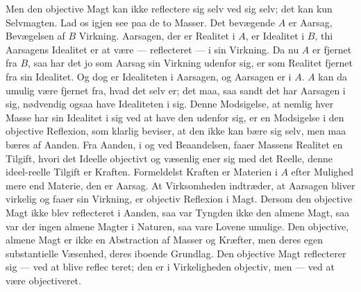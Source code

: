 \documentclass[12pt,a4paper]{book}
\begin{document}
Men den objective Magt kan ikke reflectere sig selv ved sig selv; det
kan kun Selvmagten. Lad os igjen see paa de to Masser. Det bevægende
$A$ er Aarsag, Bevægelsen af $B$ Virkning. Aarsagen, der er Realitet i
$A$, er Idealitet i $B$, thi Aarsagens Idealitet er at være ---
reflecteret --- i sin Virkning. Da nu $A$ er fjernet fra $B$, saa har
det jo som Aarsag sin Virkning udenfor sig, er som Realitet fjernet fra
sin Idealitet. Og dog er Idealiteten i Aarsagen, og Aarsagen er i $A$.
$A$ kan da umulig være fjernet fra, hvad det selv er; det maa, saa sandt
det har Aarsagen i sig, nødvendig ogsaa have Idealiteten i sig. Denne
Modsigelse, at nemlig hver Masse har sin Idealitet i sig ved at have den
udenfor sig, er en Modsigelse i den objective Reflexion, som klarlig
beviser, at den ikke kan bære sig selv, men maa bæres af Aanden. Fra
Aanden, i og ved Beaandelsen, faaer Massens Realitet en Tilgift, hvori
det Ideelle objectivt og væsenlig ener sig med det Reelle, denne
ideel-reelle Tilgift er Kraften. Formeldelst Kraften er Materien i $A$
efter Mulighed mere end Materie, den er Aarsag. At Virksomheden
indtræder, at Aarsagen bliver virkelig og faaer sin Virkning, er
objectiv Reflexion i Magt. Dersom den objective Magt ikke blev
reflecteret i Aanden, saa var Tyngden ikke den almene Magt, saa var der
ingen almene Magter i Naturen, saa vare Lovene umulige. Den objective,
almene Magt er ikke en Abstraction af Masser og Kræfter, men deres egen
substantielle Væsenhed, deres iboende Grundlag. Den objective Magt
reflecterer sig --- ved at blive reflec\-%
teret; den er i Virkeligheden objectiv, men --- ved at være
objectiveret.
\end{document}
